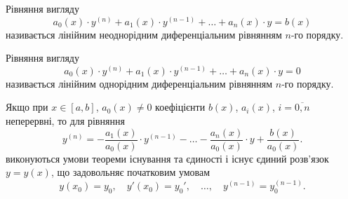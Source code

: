 Рівняння вигляду
\begin{equation*}
	a_0(x) \cdot y^{(n)} + a_1(x) \cdot y^{(n - 1)} + \ldots + a_n(x) \cdot y = b(x)
\end{equation*} 
називається лінійним неоднорідним диференціальним рівнянням $n$-го порядку. \parvskip

Рівняння вигляду
\begin{equation*}
	a_0(x) \cdot y^{(n)} + a_1(x) \cdot y^{(n - 1)} + \ldots + a_n(x) \cdot y = 0
\end{equation*} 
називається лінійним однорідним диференціальним рівнянням $n$-го порядку. \parvskip

Якщо при $x \in [a, b]$, $a_0(x) \ne 0$ коефіцієнти $b(x)$, $a_i(x)$, $i=\overline{0,n}$ неперервні, то для рівняння
\begin{equation*}
	y^{(n)} = - \frac{a_1(x)}{a_0(x)} \cdot y^{(n - 1)} - \ldots - \frac{a_n(x)}{a_0(x)} \cdot y + \frac{b(x)}{a_0(x)}.
\end{equation*}
виконуються умови теореми існування та єдиності і існує єдиний роз\-в'яз\-ок $y = y(x)$, що задовольняє початковим умовам
\begin{equation*}
	y(x_0) = y_0, \quad y'(x_0) = y_0', \quad \ldots, \quad y^{(n - 1)} = y_0^{(n - 1)}.
\end{equation*}
